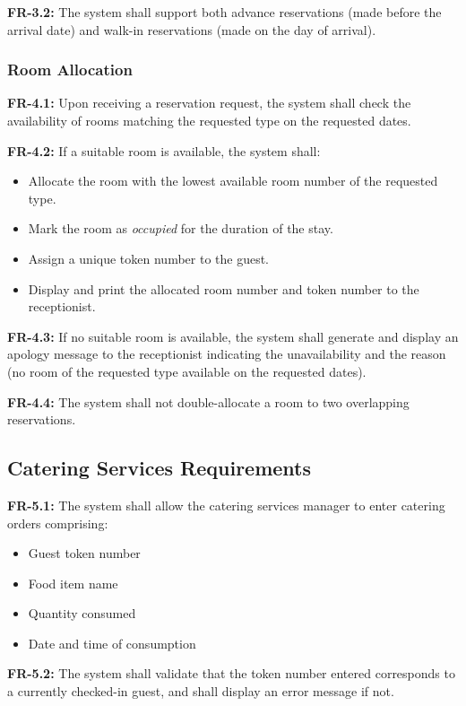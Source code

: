 \documentclass[12pt,a4paper]{article}
\newcommand{\req}[2]{%
  \noindent\textbf{\color{medblue}#1:} #2\par\smallskip
}
\begin{document}
\req{FR-3.2}{The system shall support both advance reservations (made before the arrival
date) and walk-in reservations (made on the day of arrival).}

\subsubsection{Room Allocation}

\req{FR-4.1}{Upon receiving a reservation request, the system shall check the availability
of rooms matching the requested type on the requested dates.}

\req{FR-4.2}{If a suitable room is available, the system shall:}
\begin{itemize}[leftmargin=1.5em]
  \item Allocate the room with the lowest available room number of the requested type.
  \item Mark the room as \textit{occupied} for the duration of the stay.
  \item Assign a unique token number to the guest.
  \item Display and print the allocated room number and token number to the receptionist.
\end{itemize}

\req{FR-4.3}{If no suitable room is available, the system shall generate and display an
apology message to the receptionist indicating the unavailability and the reason (no
room of the requested type available on the requested dates).}

\req{FR-4.4}{The system shall not double-allocate a room to two overlapping reservations.}

\subsection{Catering Services Requirements}

\req{FR-5.1}{The system shall allow the catering services manager to enter catering orders
comprising:}
\begin{itemize}[leftmargin=1.5em]
  \item Guest token number
  \item Food item name
  \item Quantity consumed
  \item Date and time of consumption
\end{itemize}

\req{FR-5.2}{The system shall validate that the token number entered corresponds to a
currently checked-in guest, and shall display an error message if not.}
\end{document}
